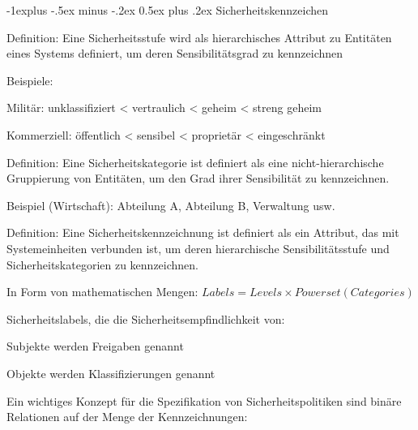\documentclass[a4paper]{article}
\makeatletter
\renewcommand{\subsection}{\@startsection{subsection}{2}{0mm}%
 {-1explus -.5ex minus -.2ex}%
 {0.5ex plus .2ex}%
 {\normalfont\normalsize\bfseries}}
\makeatother
\begin{document}
\begin{multicols}{3}
      \subsection{Sicherheitskennzeichen}
      \begin{itemize*}
            \item Definition: Eine Sicherheitsstufe wird als hierarchisches Attribut zu Entitäten eines Systems definiert, um deren Sensibilitätsgrad zu kennzeichnen
            \begin{itemize*}
                  \item Beispiele:
                  \begin{itemize*}
                        \item Militär: unklassifiziert < vertraulich < geheim < streng geheim
                        \item Kommerziell: öffentlich < sensibel < proprietär < eingeschränkt
                  \end{itemize*}
            \end{itemize*}
            \item Definition: Eine Sicherheitskategorie ist definiert als eine nicht-hierarchische Gruppierung von Entitäten, um den Grad ihrer Sensibilität zu kennzeichnen.
            \begin{itemize*}
                  \item Beispiel (Wirtschaft): Abteilung A, Abteilung B, Verwaltung usw.
            \end{itemize*}
            \item Definition: Eine Sicherheitskennzeichnung ist definiert als ein Attribut, das mit Systemeinheiten verbunden ist, um deren hierarchische Sensibilitätsstufe und Sicherheitskategorien zu kennzeichnen.
            \begin{itemize*}
                  \item In Form von mathematischen Mengen: $Labels = Levels \times Powerset(Categories)$
            \end{itemize*}
            \item Sicherheitslabels, die die Sicherheitsempfindlichkeit von:
            \begin{itemize*}
                  \item Subjekte werden Freigaben genannt
                  \item Objekte werden Klassifizierungen genannt
            \end{itemize*}
            \item Ein wichtiges Konzept für die Spezifikation von Sicherheitspolitiken sind binäre Relationen auf der Menge der Kennzeichnungen:

\end{itemize*}
\end{multicols}
\end{document}
